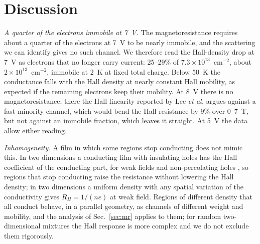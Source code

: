\documentclass[11pt]{article}
\begin{document}
\section{Discussion}\label{sec:disc}
\emph{A quarter of the electrons immobile at 7~V.} The magnetoresistance requires about a quarter of the electrons at 7~V to be nearly immobile, and the scattering we can identify gives no such channel. We therefore read the Hall-density drop at 7~V as electrons that no longer carry current: 25--29\% of $7.3\times10^{13}$~cm$^{-2}$, about $2\times10^{13}$~cm$^{-2}$, immobile at 2~K at fixed total charge. Below 50~K the conductance falls with the Hall density at nearly constant Hall mobility, as expected if the remaining electrons keep their mobility. At 8~V there is no magnetoresistance; there the Hall linearity reported by Lee \emph{et al.} argues against a fast minority channel, which would bend the Hall resistance by 9\% over 0--7~T, but not against an immobile fraction, which leaves it straight. At 5~V the data allow either reading.

\emph{Inhomogeneity.} A film in which some regions stop conducting does not mimic this. In two dimensions a conducting film with insulating holes has the Hall coefficient of the conducting part, for weak fields and non-percolating holes \cite{Juretschke1956}, so regions that stop conducting raise the resistance without lowering the Hall density; in two dimensions a uniform density with any spatial variation of the conductivity gives $R_H=1/(ne)$ at weak field. Regions of different density that all conduct behave, in a parallel geometry, as channels of different weight and mobility, and the analysis of Sec.~\ref{sec:mr} applies to them; for random two-dimensional mixtures the Hall response is more complex and we do not exclude them rigorously.
\end{document}
